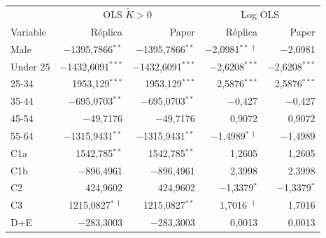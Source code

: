 \begin{tabular}{lrrrr}\toprule
 & \multicolumn{2}{c}{OLS $\tilde K>0$} & \multicolumn{2}{c}{Log OLS} \\
Variable & Réplica & Paper & Réplica & Paper \\\midrule
Male & $-$1395,7866$^{**}$ & $-$1395,7866$^{**}$ & $-$2,0981$^{**\,\dagger}$ & $-$2,0981 \\
Under 25 & $-$1432,6091$^{***}$ & $-$1432,6091$^{***}$ & $-$2,6208$^{***}$ & $-$2,6208$^{***}$ \\
25-34 & 1953,129$^{***}$ & 1953,129$^{***}$ & 2,5876$^{***}$ & 2,5876$^{***}$ \\
35-44 & $-$695,0703$^{**}$ & $-$695,0703$^{**}$ & $-$0,427 & $-$0,427 \\
45-54 & $-$49,7176 & $-$49,7176 & 0,9072 & 0,9072 \\
55-64 & $-$1315,9431$^{**}$ & $-$1315,9431$^{**}$ & $-$1,4989$^{*\,\dagger}$ & $-$1,4989 \\
C1a & 1542,785$^{**}$ & 1542,785$^{**}$ & 1,2605 & 1,2605 \\
C1b & $-$896,4961 & $-$896,4961 & 2,3998 & 2,3998 \\
C2 & 424,9602 & 424,9602 & $-$1,3379$^{*}$ & $-$1,3379$^{*}$ \\
C3 & 1215,0827$^{*\,\dagger}$ & 1215,0827$^{**}$ & 1,7016$^{\cdot\,\dagger}$ & 1,7016 \\
D+E & $-$283,3003 & $-$283,3003 & 0,0013 & 0,0013 \\
\bottomrule\end{tabular}
